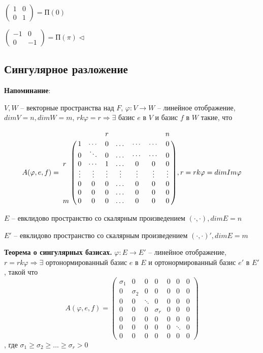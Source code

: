 $\begin{pmatrix} 1 & 0 \\ 0 & 1 \end{pmatrix} = П(0)$

$\begin{pmatrix} -1 & 0 \\ 0 & -1 \end{pmatrix} = П(\pi) \lhd$

\subsection{Сингулярное разложение}

\textbf{Напоминание}:

$V, W$ -- векторные пространства над $F$, $\varphi: V \rightarrow W$ -- линейное отображение, $dim V = n, dim W = m$, $rk \varphi = r \Rightarrow \exists$ базис $e$ в $V$ и базис $f$ в $W$ такие, что 

\begin{equation*} A(\varphi, e, f) = \bordermatrix{ 
    	 & & & r & & & & n \cr
    	 & 1 & \cdots & 0 & \dots & \cdots & \cdots & 0 \cr 
         & 0 & \ddots & 0 & \dots & \cdots & \cdots & 0 \cr
		r & 0 & \cdots & 1 & \dots & 0 & 0 & 0  \cr
         & \vdots & \vdots & \vdots & \vdots & \vdots & \vdots & \vdots \cr
        & 0 & 0 & 0 & \dots & 0 & 0 & 0  \cr
        & 0 & 0 & 0 & \dots & 0 & 0 & 0  \cr
       m & 0 & 0 & 0 & \dots  & 0 & 0 & 0 }, r = rk \varphi = dim Im \varphi
\end{equation*}

\vspace{\baselineskip}
$E$ -- евклидово пространство со скалярным произведением $(\cdot, \cdot), dimE = n$

$E'$ -- евклидово пространство со скалярным произведением $(\cdot, \cdot)', dimE = m$

\vspace{\baselineskip}
\textbf{Теорема о сингулярных базисах.} $\varphi: E \rightarrow E'$ -- линейное отображение, $r = rk \varphi \Rightarrow \exists$ ортонормированный базис $e$ в $E$ и ортонормированный базис $e'$ в $E'$, такой что \begin{equation*}A(\varphi, e, f) = \begin{pmatrix} \sigma_1 & 0 & 0 & 0 & 0 & 0 & 0 \\  0 & \sigma_2 & 0 & 0 & 0 & 0 & 0 \\ 0 & 0 & \ddots & 0 & 0 & 0 & 0 \\ 0 & 0 & 0 & \sigma_r & 0 & 0 & 0 \\ 0 & 0 & 0 & 0 & 0 & 0 & 0 \\ 0 & 0 & 0 & 0 & 0 & \ddots & 0 \\ 0 & 0 & 0 & 0 & 0 & 0 & 0  \end{pmatrix}\end{equation*}, где $\sigma_1 \geqslant \sigma_2 \geqslant \dots \geqslant \sigma_r > 0$

